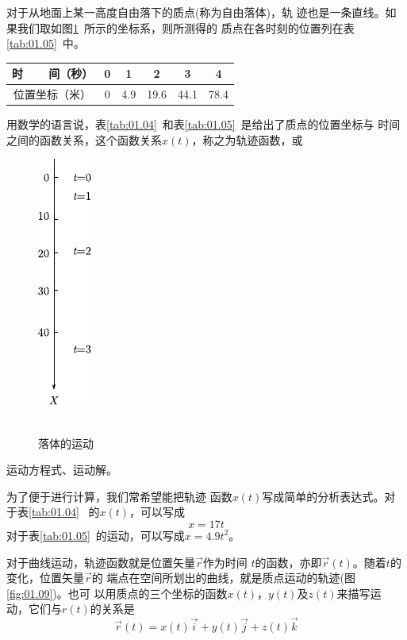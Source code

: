 对于从地面上某一高度自由落下的质点(称为自由落体)，轨
迹也是一条直线。如果我们取如图\ref{fig:01.08}~所示的坐标系，则所测得的
质点在各时刻的位置列在表\ref{tab:01.05}~中。
\begin{tablex}[!h]
    \caption{}
    \label{tab:01.05}
    \centering
        \begin{tabularx}{\linewidth}{c*{5}{|C}}
            \toprule
            时~~~~间（秒） & 0 & 1   & 2    & 3    & 4    \\
            \midrule
            位置坐标（米） & 0 & 4.9 & 19.6 & 44.1 & 78.4 \\
            \bottomrule
        \end{tabularx}
\end{tablex}

用数学的语言说，表\ref{tab:01.04}~和表\ref{tab:01.05}~是给出了质点的位置坐标与
时间之间的函数关系，这个函数关系$x(t)$，称之为轨迹函数，或
\begin{figure}
    \centering
    \includegraphics{figure/fig01.08}
    \\ ~ \\
    \caption{落体的运动}
    \label{fig:01.08}
\end{figure}
运动方程式、运动解。

为了便于进行计算，我们常希望能把轨迹
函数$x(t)$写成简单的分析表达式。对于表\ref{tab:01.04}~
的$x(t)$，可以写成
\begin{equation}\label{eqn:01.05.01}
    x=17t
\end{equation}
对于表\ref{tab:01.05}~的运动，可以写成$x=4.9t^2$。

对于曲线运动，轨迹函数就是位置矢量$\vec{r}$作为时间
$t$的函数，亦即$\vec{r}(t)$。随着$t$的变化，位置矢量$\vec{r}$的
端点在空间所划出的曲线，就是质点运动的轨迹(图\ref{fig:01.09})。也可
以用质点的三个坐标的函数$x(t)$，$y(t)$及$z(t)$来描写运
动，它们与$r(t)$的关系是
\clearpage
\begin{equation}\label{eqn:01.05.02}
    \vec{r}(t)=x(t)\vec{i}+y(t)\vec{j}+z(t)\vec{k}
\end{equation}


